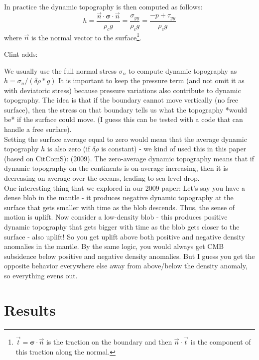 \noindent 
In practice the dynamic topography is then computed as follows: 
\[
h= \frac{\vec{n} \cdot {\bm \sigma}\cdot \vec{n}}{\rho_c g } 
= \frac{\sigma_{yy}}{\rho_c g}
= \frac{-p+\tau_{yy}}{\rho_c g}
\]
where $\vec{n}$ is the normal vector to the surface\footnote{$\vec{t} ={\bm\sigma}\cdot \vec{n}$ 
is the traction on the boundary and then $\vec n \cdot \vec t$ is the component of this traction
along the normal.}. 

Clint adds:
\begin{displayquote}
{\color{darkgray}
We usually use the full normal stress $\sigma_n$ to compute dynamic topography as $h=\sigma_n/(\delta \rho * g)$
It is important to keep the pressure term (and not omit it as with deviatoric stress) because pressure variations 
also contribute to dynamic topography. The idea is that if the boundary cannot move vertically (no free surface), 
then the stress on that boundary tells us what the topography *would be* if the surface could move. 
(I guess this can be tested with a code that can handle a free surface).
\\
Setting the surface average equal to zero would mean that the average dynamic topography $h$ 
is also zero (if $\delta \rho$ is constant) - we kind of used this in this paper (based on CitComS):
\textcite{cohu09} (2009).
The zero-average dynamic topography means that if dynamic topography on the continents is on-average 
increasing, then it is decreasing on-average over the oceans, leading to sea level drop.
\\
One interesting thing that we explored in our 2009 paper: Let’s say you have a dense blob 
in the mantle - it produces negative dynamic topography at the surface that gets smaller 
with time as the blob descends. Thus, the sense of motion is uplift. 
Now consider a low-density blob - this produces positive dynamic topography that gets 
bigger with time as the blob gets closer to the surface - also uplift! 
So you get uplift above both positive and negative density anomalies in 
the mantle. By the same logic, you would always get CMB subsidence below positive and negative 
density anomalies. But I guess you get the opposite behavior everywhere else 
away from above/below the density anomaly, so everything evens out. 

}
\end{displayquote}


\newpage
\section*{Results}

